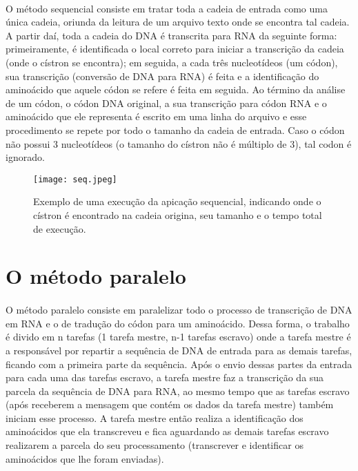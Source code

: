 \documentclass[a4paper,10pt]{article}
\begin{document}
\paragraph{}O método sequencial consiste em tratar toda a cadeia de entrada como uma única cadeia, oriunda da leitura de um arquivo texto onde se encontra tal cadeia. A partir daí, toda a cadeia do DNA é transcrita para RNA da seguinte forma: primeiramente, é identificada o local correto para iniciar a transcrição da cadeia (onde o cístron se encontra); em seguida, a cada três nucleotídeos (um códon), sua transcrição (conversão de DNA para RNA) é feita e a identificação do aminoácido que aquele códon se refere é feita em seguida. Ao término da análise de um códon, o códon DNA original, a sua transcrição para códon RNA e o aminoácido que ele representa é escrito em uma linha do arquivo e esse procedimento se repete por todo o tamanho da cadeia de entrada. Caso o códon não possui 3 nucleotídeos (o tamanho do cístron não é múltiplo de 3), tal codon é ignorado. 

\begin{figure}[!htb]
\texttt{[image: seq.jpeg]}
\caption{Exemplo de uma execução da apicação sequencial, indicando onde o cístron é encontrado na cadeia origina, seu tamanho e o tempo total de execução.}
\label{arvore}
\end{figure}
\newpage


\section{O método paralelo}

\paragraph{}O método paralelo consiste em paralelizar todo o processo de transcrição de DNA em RNA e o de tradução do códon para um aminoácido. Dessa forma, o trabalho é divido em n tarefas (1 tarefa mestre, n-1 tarefas escravo) onde a tarefa mestre é a responsável por repartir a sequência de DNA de entrada para as demais tarefas, ficando com a primeira parte da sequência. Após o envio dessas partes da entrada para cada uma das tarefas escravo, a tarefa mestre faz a transcrição da sua parcela da sequência de DNA para RNA, ao mesmo tempo que as tarefas escravo (após receberem a mensagem que contém os dados da tarefa mestre) também iniciam esse processo. A tarefa mestre então realiza a identificação dos aminoácidos que ela transcreveu e fica aguardando as demais tarefas escravo realizarem a parcela do seu processamento (transcrever e identificar os aminoácidos que lhe foram enviadas).\\
\end{document}
